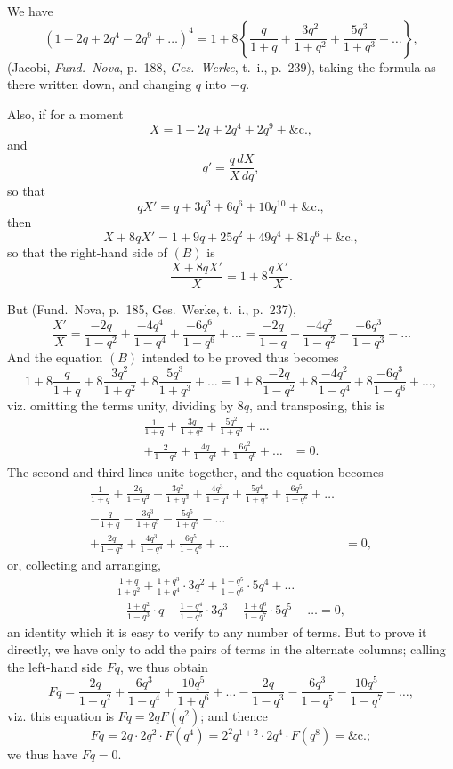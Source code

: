 \documentclass[12pt,a4paper]{article}
\theoremstyle{plain}
\theoremstyle{definition}
\theoremstyle{remark}
\begin{document}
We have
\[
(1-2q+2q^4-2q^9+\ldots)^4 = 1 + 8\left\{\frac{q}{1+q} + \frac{3q^2}{1+q^2} + \frac{5q^3}{1+q^3} + \ldots\right\},
\]
(Jacobi, \textit{Fund.~Nova}, p.~188, \textit{Ges.~Werke}, t.~i., p.~239), taking the formula as there written down, and changing $q$ into $-q$.

Also, if for a moment
\[
X = 1 + 2q + 2q^4 + 2q^9 + \&\text{c.},
\]
and
\[
q' = \frac{q\, dX}{X\, dq},
\]
so that
\[
qX' = q + 3q^3 + 6q^6 + 10q^{10} + \&\text{c.},
\]
then
\[
X + 8qX' = 1 + 9q + 25q^2 + 49q^4 + 81q^6 + \&\text{c.},
\]
so that the right-hand side of $(B)$ is
\[
\frac{X + 8qX'}{X} = 1 + 8\frac{qX'}{X}.
\]

But (Fund.~Nova, p.~185, Ges.~Werke, t.~i., p.~237),
\[
\frac{X'}{X} = \frac{-2q}{1-q^2} + \frac{-4q^4}{1-q^4} + \frac{-6q^6}{1-q^6} + \ldots = \frac{-2q}{1-q} + \frac{-4q^2}{1-q^2} + \frac{-6q^3}{1-q^3} - \ldots
\]
And the equation $(B)$ intended to be proved thus becomes
\[
1 + 8\frac{q}{1+q} + 8\frac{3q^2}{1+q^2} + 8\frac{5q^3}{1+q^3} + \ldots = 1 + 8\frac{-2q}{1-q^2} + 8\frac{-4q^2}{1-q^4} + 8\frac{-6q^3}{1-q^6} + \ldots,
\]
viz. omitting the terms unity, dividing by $8q$, and transposing, this is
\begin{align*}
\frac{1}{1+q} + \frac{3q}{1+q^2} + \frac{5q^2}{1+q^3} + \ldots \\
+ \frac{2}{1-q^2} + \frac{4q}{1-q^4} + \frac{6q^2}{1-q^6} + \ldots &= 0.
\end{align*}
The second and third lines unite together, and the equation becomes
\begin{align*}
\frac{1}{1+q} + \frac{2q}{1-q^2} + \frac{3q^2}{1+q^3} + \frac{4q^3}{1-q^4} + \frac{5q^4}{1+q^5} + \frac{6q^5}{1-q^6} + \ldots \\
- \frac{q}{1+q} - \frac{3q^3}{1+q^3} - \frac{5q^5}{1+q^5} - \ldots \\
+ \frac{2q}{1-q^2} + \frac{4q^3}{1-q^4} + \frac{6q^5}{1-q^6} + \ldots &= 0,
\end{align*}
or, collecting and arranging,
\begin{multline*}
\frac{1+q}{1+q^2} + \frac{1+q^3}{1+q^4} \cdot 3q^2 + \frac{1+q^5}{1+q^6} \cdot 5q^4 + \ldots \\
- \frac{1+q^2}{1-q^3} \cdot q - \frac{1+q^4}{1-q^5} \cdot 3q^3 - \frac{1+q^6}{1-q^7} \cdot 5q^5 - \ldots = 0,
\end{multline*}
an identity which it is easy to verify to any number of terms. But to prove it directly, we have only to add the pairs of terms in the alternate columns; calling the left-hand side $Fq$, we thus obtain
\[
Fq = \frac{2q}{1+q^2} + \frac{6q^3}{1+q^4} + \frac{10q^5}{1+q^6} + \ldots - \frac{2q}{1-q^3} - \frac{6q^3}{1-q^5} - \frac{10q^5}{1-q^7} - \ldots,
\]
viz. this equation is $Fq = 2qF(q^2)$; and thence
\[
Fq = 2q \cdot 2q^2 \cdot F(q^4) = 2^2 q^{1+2} \cdot 2q^4 \cdot F(q^8) = \&\text{c.};
\]
we thus have $Fq = 0$.
\end{document}
